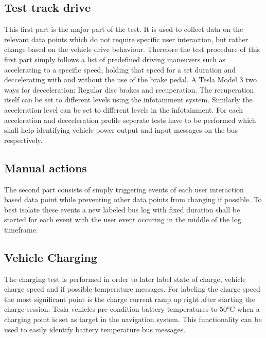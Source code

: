 \documentclass[11pt]{article}
\begin{document}
\clearpage

\subsection{Test track drive}
This first part is the major part of the test. It is used to collect data on the relevant data points which do not require specific user interaction, but rather change based on the vehicle drive behaviour.
Therefore the test procedure of this first part simply follows a list of predefined driving maneuvers such as accelerating to a specific speed, holding that speed for a set duration and deccelerating with and without the use of the brake pedal.
A Tesla Model 3 two ways for decceleration: Regular disc brakes and recuperation. The recuperation itself can be set to different levels using the infotainment system. Similarly the acceleration level can be set to different levels in the infotainment.
For each acceleration and decceleration profile seperate tests have to be performed which shall help identifying vehicle power output and input messages on the bus respectively.

\subsection{Manual actions}
The second part consists of simply triggering events of each user interaction based data point while preventing other data points from changing if possible. To best isolate these events a new labeled bus log with fixed duration shall be started for each event with the user event occuring in the middle of the log timeframe.

\subsection{Vehicle Charging}
The charging test is performed in order to later label state of charge, vehicle charge speed and if possible temperature messages. For labeling the charge speed the most significant point is the charge current ramp up right after starting the charge session. Tesla vehicles pre-condition battery temperatures to 50°C when a charging point is set as target in the navigation system. This functionality can be used to easily identify battery temperature bus messages.
\end{document}
